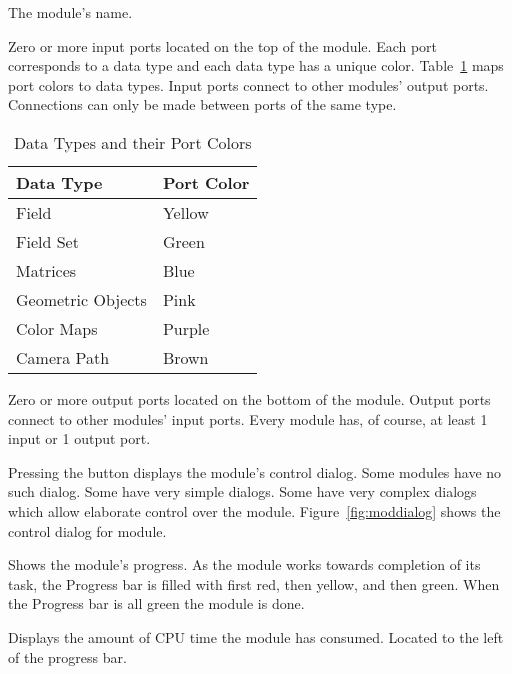\begin{description}
   The module's name.
  
   Zero or more input ports located on the top
  of the module.  Each port corresponds to a data type and each data
  type has a unique color.  Table~\ref{tab:portcolors} maps port
  colors to data types.  Input ports connect to other modules' output
  ports.  Connections can only be made between ports of the same type.

  \begin{table}[htbp]
    \begin{center}
      \begin{tabular}{|l|l|}
        \hline
        \textbf{Data Type} & \textbf{Port Color} \\
        \hline
        Field & Yellow \\
        Field Set & Green \\
        Matrices & Blue \\
        Geometric Objects & Pink \\
        Color Maps & Purple \\
        Camera Path & Brown \\
        \hline
      \end{tabular}
      \caption{Data Types and their Port Colors}
      \label{tab:portcolors}
    \end{center}
  \end{table}
  
   Zero or more output ports located on the
  bottom of the module.  Output ports connect to other modules' input
  ports.  Every module has, of course, at least 1 input or 1 output
  port.
  
   Pressing the  button displays the
  module's control dialog. Some modules have no such dialog. Some have
  very simple dialogs.  Some have very complex dialogs which allow
  elaborate control over the module.  Figure~\ref{fig:moddialog} shows
  the control dialog for  module.
  
   Shows the module's progress.  As the module
  works towards completion of its task, the Progress bar is filled
  with first red, then yellow, and then green.  When the Progress bar
  is all green the module is done.
  
   Displays the amount of CPU time the module has
  consumed.  Located to the left of the progress bar.
  

\end{description}
